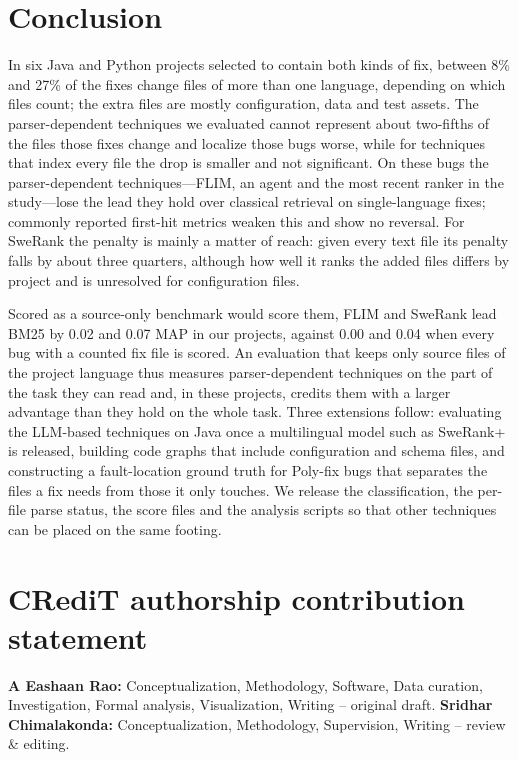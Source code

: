 \documentclass[a4paper,fleqn]{cas-dc}
\begin{document}
\section{Conclusion}\label{sec:conclusion}

In six Java and Python projects selected to contain both kinds of fix, between
8\% and 27\% of the fixes change files of more than one language, depending on
which files count; the extra files are mostly configuration, data and test
assets. The parser-dependent techniques we evaluated cannot represent about
two-fifths of the files those fixes change and localize those bugs worse,
while for techniques that index every file the drop is smaller and not
significant. On these bugs the parser-dependent techniques---FLIM, an agent
and the most recent ranker in the study---lose the lead they hold over
classical retrieval on single-language fixes; commonly reported first-hit
metrics weaken this and show no reversal. For SweRank the penalty is mainly a
matter of reach: given every text file its penalty falls by about three
quarters, although how well it ranks the added files differs by project and
is unresolved for configuration files.

Scored as a source-only benchmark would score them, FLIM and SweRank lead
BM25 by 0.02 and 0.07 MAP in our projects, against 0.00 and 0.04 when every
bug with a counted fix file is scored. An evaluation that keeps only source
files of the project language thus measures parser-dependent techniques on the
part of the task they can read and, in these projects, credits them with a
larger advantage than they hold on the whole task. Three extensions follow: evaluating the LLM-based techniques on
Java once a multilingual model such as SweRank+ is released, building code
graphs that include configuration and schema files, and constructing a
fault-location ground truth for Poly-fix bugs that separates the files a fix
needs from those it only touches. We release the classification, the per-file
parse status, the score files and the analysis scripts so that other
techniques can be placed on the same footing.


\section*{CRediT authorship contribution statement}
\textbf{A Eashaan Rao:} Conceptualization, Methodology, Software, Data curation,
Investigation, Formal analysis, Visualization, Writing -- original draft.
\textbf{Sridhar Chimalakonda:} Conceptualization, Methodology, Supervision,
Writing -- review \& editing.
\end{document}
